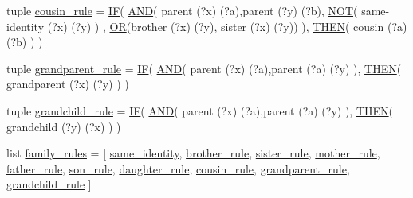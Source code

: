 \begin{DoxyCompactItemize}
\item 
tuple \hyperlink{namespacelab1_aea4380bf61363b1b23cf9a7d7a5c81eb}{cousin\+\_\+rule} = \hyperlink{classproduction_1_1_i_f}{I\+F}( \hyperlink{classproduction_1_1_a_n_d}{A\+N\+D}( \textquotesingle{}parent (?x) (?a)\textquotesingle{},\textquotesingle{}parent (?y) (?b)\textquotesingle{}, \hyperlink{classproduction_1_1_n_o_t}{N\+O\+T}( \textquotesingle{}same-\/identity (?x) (?y)\textquotesingle{} ) , \hyperlink{classproduction_1_1_o_r}{O\+R}(\textquotesingle{}brother (?x) (?y)\textquotesingle{}, \textquotesingle{}sister (?x) (?y)\textquotesingle{}) ), \hyperlink{classproduction_1_1_t_h_e_n}{T\+H\+E\+N}( \textquotesingle{}cousin (?a) (?b)\textquotesingle{} ) )
\item 
tuple \hyperlink{namespacelab1_ab7ef57c55451e9eeceb1222753b433ee}{grandparent\+\_\+rule} = \hyperlink{classproduction_1_1_i_f}{I\+F}( \hyperlink{classproduction_1_1_a_n_d}{A\+N\+D}( \textquotesingle{}parent (?x) (?a)\textquotesingle{},\textquotesingle{}parent (?a) (?y)\textquotesingle{} ), \hyperlink{classproduction_1_1_t_h_e_n}{T\+H\+E\+N}( \textquotesingle{}grandparent (?x) (?y)\textquotesingle{} ) )
\item 
tuple \hyperlink{namespacelab1_a9f7506c66c0a19593b0923d38db336e6}{grandchild\+\_\+rule} = \hyperlink{classproduction_1_1_i_f}{I\+F}( \hyperlink{classproduction_1_1_a_n_d}{A\+N\+D}( \textquotesingle{}parent (?x) (?a)\textquotesingle{},\textquotesingle{}parent (?a) (?y)\textquotesingle{} ), \hyperlink{classproduction_1_1_t_h_e_n}{T\+H\+E\+N}( \textquotesingle{}grandchild (?y) (?x)\textquotesingle{} ) )
\item 
list \hyperlink{namespacelab1_a0385b05a0f007b7449d100d5f61a43a6}{family\+\_\+rules} = \mbox{[} \hyperlink{namespacelab1_a898e66c595856ca61d7a684347e1587d}{same\+\_\+identity}, \hyperlink{namespacelab1_a2a12c1747bc9ea2b9438e91ff8de062f}{brother\+\_\+rule}, \hyperlink{namespacelab1_af4f117ff665235f6bade3d725b728f59}{sister\+\_\+rule}, \hyperlink{namespacelab1_ab6b172e48334828812e03a3a574b30e2}{mother\+\_\+rule}, \hyperlink{namespacelab1_abc6ad6a1170b6579aaeb533235ca881a}{father\+\_\+rule}, \hyperlink{namespacelab1_a2a1ea2c1c23fef0cfcd295caf1235fc0}{son\+\_\+rule}, \hyperlink{namespacelab1_a326d672f8f3e2d6fbd42c1f9208b25c6}{daughter\+\_\+rule}, \hyperlink{namespacelab1_aea4380bf61363b1b23cf9a7d7a5c81eb}{cousin\+\_\+rule}, \hyperlink{namespacelab1_ab7ef57c55451e9eeceb1222753b433ee}{grandparent\+\_\+rule}, \hyperlink{namespacelab1_a9f7506c66c0a19593b0923d38db336e6}{grandchild\+\_\+rule} \mbox{]}
\item 

\end{DoxyCompactItemize}
